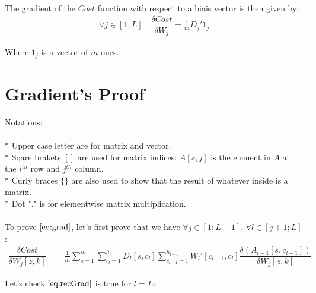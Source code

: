 \documentclass[]{article}
\begin{document}
The gradient of the $Cost$ function with respect to a biais vector is then given by:\\

\begin{align}
\forall j \in [1;L] \quad \dfrac{\delta Cost}{\delta W_{j}}=\frac{1}{m}   D_{j}'  1_{j} \label{eq:gradBiases}
\end{align}

Where $1_{j}$ is a vector of $m$  ones.

\section{Gradient's Proof}

Notations:\\
\\
* Upper case letter are for matrix and vector.\\
* Sqare brakets $\left[ \right]$ are used for matrix indices: $A[s,j]$ is the element in $A$ at the $i^{th}$ row and $j^{th}$ column.\\
* Curly braces $\lbrace \rbrace$ are also used to show that the result of whatever inside is a matrix.\\
* Dot "." is for elementwise matrix multiplication.\\
\\
To prove $\eqref{eq:grad}$, let's first prove that we have $\forall j \in [1;L-1]$, $\forall l \in [j+1;L]$:\\

\begin{align}
\dfrac{\delta Cost}{\delta W_{j}[z,k]}&=\frac{1}{m}\sum_{s=1}^{m}\sum_{c_{l}=1}^{h_{l}}D_{l}[s,c_{l}] \sum_{c_{l-1}=1}^{h_{l-1}}W_{l}' [c_{l-1},c_{l}]\dfrac{\delta (A_{l-1}[s,c_{l-1}])}{\delta W_{j}[z,k]} \label{eq:recGrad}
\end{align}

Let's check $\eqref{eq:recGrad}$  is true for $l=L$:\\
\end{document}
